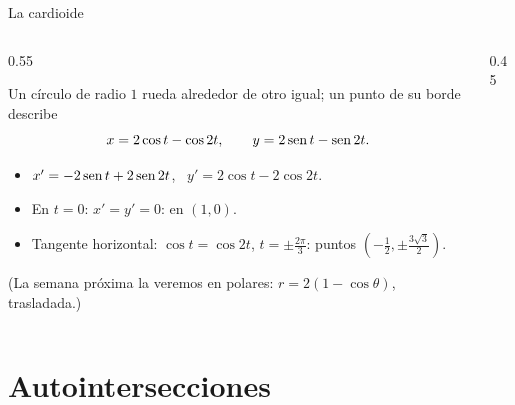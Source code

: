 \documentclass[10pt,aspectratio=169]{beamer}
\begin{document}
\begin{frame}{La cardioide}
  \begin{columns}
    \begin{column}{0.55\textwidth}
      \begin{ejemplo}[3]
        Un círculo de radio $1$ rueda alrededor de otro igual; un punto de su borde describe
        \[ x=2\cos t-\cos2t,\qquad y=2\operatorname{sen} t-\operatorname{sen}2t. \]
        \begin{itemize}
          \item $x'=-2\operatorname{sen} t+2\operatorname{sen}2t$, \ $y'=2\cos t-2\cos2t$.
          \item En $t=0$: $x'=y'=0$:  en $(1,0)$.
          \item Tangente horizontal: $\cos t=\cos2t$, $t=\pm\frac{2\pi}3$: puntos $\left(-\frac12,\pm\frac{3\sqrt3}{2}\right)$.
        \end{itemize}
      \end{ejemplo}
      \small (La semana próxima la veremos en polares: $r=2(1-\cos\theta)$, trasladada.)
    \end{column}
    \begin{column}{0.45\textwidth}
      \centering
    \end{column}
  \end{columns}
\end{frame}

\section{Autointersecciones}
\end{document}
